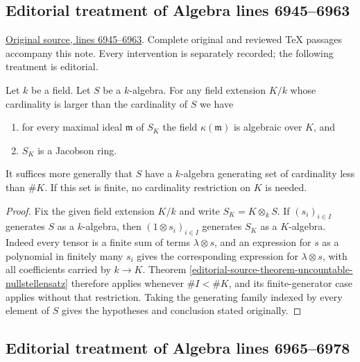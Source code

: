 \subsection{Editorial treatment of Algebra lines 6945--6963}

\hypertarget{algebra-context-062}{}

\noindent\href{https://github.com/stacks/stacks-project/blob/a04446e57ec1fbc252a871afcec7752fb2807b14/algebra.tex\#L6945}{Original source, lines 6945--6963}. Complete original and reviewed TeX passages accompany this note. Every intervention is separately recorded; the following treatment is editorial.


\begin{lemma}
\label{editorial-source-lemma-base-change-Jacobson}
Let $k$ be a field. Let $S$ be a $k$-algebra.
For any field extension $K/k$ whose cardinality is larger
than the cardinality of $S$ we have
\begin{enumerate}
\item for every maximal ideal $\mathfrak m$ of $S_K$ the field
$\kappa(\mathfrak m)$ is algebraic over $K$, and
\item $S_K$ is a Jacobson ring.
\end{enumerate}
It suffices more generally that $S$ have a $k$-algebra generating
set of cardinality less than $\#K$. If this set is finite, no
cardinality restriction on $K$ is needed.
\end{lemma}

\begin{proof}
Fix the given field extension $K/k$ and write
$S_K=K\otimes_kS$. If $(s_i)_{i\in I}$ generates $S$ as a
$k$-algebra, then $(1\otimes s_i)_{i\in I}$ generates $S_K$ as a
$K$-algebra. Indeed every tensor is a finite sum of terms
$\lambda\otimes s$, and an expression for $s$ as a polynomial
in finitely many $s_i$ gives the corresponding expression for
$\lambda\otimes s$, with all coefficients carried by $k\to K$.
Theorem \ref{editorial-source-theorem-uncountable-nullstellensatz} therefore applies
whenever $\#I<\#K$, and its finite-generator case applies without
that restriction. Taking the generating family indexed by every
element of $S$ gives the hypotheses and conclusion stated originally.
\end{proof}


\subsection{Editorial treatment of Algebra lines 6965--6978}

